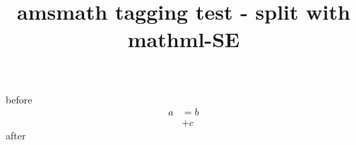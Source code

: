 \documentclass{article}
\title{amsmath tagging test - split with mathml-SE}
\begin{document}
before
\begin{equation}
\begin{split}
 a & =  b\\
   & +  c
\end{split}
\end{equation}
after
\end{document}
